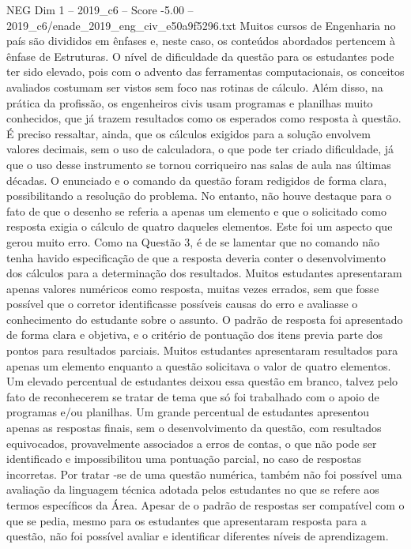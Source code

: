 \begin{textsample}{NEG Dim 1 – 2019\_c6 – Score -5.00 – 2019\_c6/enade\_2019\_eng\_civ\_e50a9f5296.txt}
Muitos cursos de Engenharia no país são divididos em ênfases e, neste caso, os conteúdos abordados pertencem à ênfase de Estruturas.
O nível de dificuldade da questão para os estudantes pode ter sido elevado, pois com o advento das ferramentas computacionais, os conceitos avaliados costumam ser vistos sem foco nas rotinas de cálculo.
Além disso, na prática da profissão, os engenheiros civis usam programas e planilhas muito conhecidos, que já trazem resultados como os esperados como resposta à questão.
É preciso ressaltar, ainda, que os cálculos exigidos para a solução envolvem valores decimais, sem o uso de calculadora, o que pode ter criado dificuldade, já que o uso desse instrumento se tornou corriqueiro nas salas de aula nas últimas décadas.
O enunciado e o comando da questão foram redigidos de forma clara, possibilitando a resolução do problema.
No entanto, não houve destaque para o fato de que o desenho se referia a apenas um elemento e que o solicitado como resposta exigia o cálculo de quatro daqueles elementos.
Este foi um aspecto que gerou muito erro.
Como na Questão 3, é de se lamentar que no comando não tenha havido especificação de que a resposta deveria conter o desenvolvimento dos cálculos para a determinação dos resultados.
Muitos estudantes apresentaram apenas valores numéricos como resposta, muitas vezes errados, sem que fosse possível que o corretor identificasse possíveis causas do erro e avaliasse o conhecimento do estudante sobre o assunto.
O padrão de resposta foi apresentado de forma clara e objetiva, e o critério de pontuação dos itens previa parte dos pontos para resultados parciais.
Muitos estudantes apresentaram resultados para apenas um elemento enquanto a questão solicitava o valor de quatro elementos.
Um elevado percentual de estudantes deixou essa questão em branco, talvez pelo fato de reconhecerem se tratar de tema que só foi trabalhado com o apoio de programas e/ou planilhas.
Um grande percentual de estudantes apresentou apenas as respostas finais, sem o desenvolvimento da questão, com resultados equivocados, provavelmente associados a erros de contas, o que não pode ser identificado e impossibilitou uma pontuação parcial, no caso de respostas incorretas.
Por tratar -se de uma questão numérica, também não foi possível uma avaliação da linguagem técnica adotada pelos estudantes no que se refere aos termos específicos da Área.
Apesar de o padrão de respostas ser compatível com o que se pedia, mesmo para os estudantes que apresentaram resposta para a questão, não foi possível avaliar e identificar diferentes níveis de aprendizagem.

\end{textsample}
